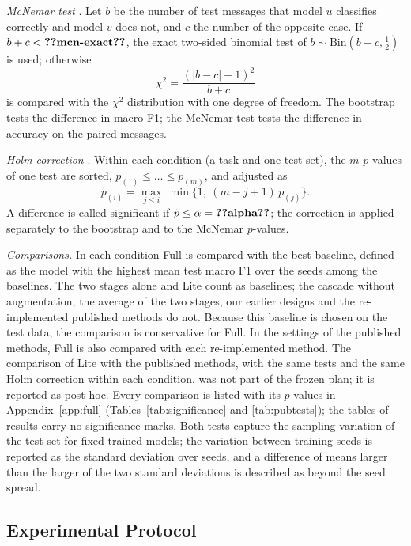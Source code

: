 \emph{McNemar test} \cite{mcnemar1947,dietterich1998}. Let $b$ be the number of test messages that model $u$ classifies correctly and model $v$ does not, and $c$ the number of the opposite case. If $b+c<\val{mcn-exact}$, the exact two-sided binomial test of $b\sim\mathrm{Bin}(b+c,\tfrac{1}{2})$ is used; otherwise
\begin{equation}\label{eq:mcnemar}
\chi^2=\frac{(|b-c|-1)^2}{b+c}
\end{equation}
is compared with the $\chi^2$ distribution with one degree of freedom. The bootstrap tests the difference in macro F1; the McNemar test tests the difference in accuracy on the paired messages.

\emph{Holm correction} \cite{holm1979,aickin1996}. Within each condition (a task and one test set), the $m$ $p$-values of one test are sorted, $p_{(1)}\le\dots\le p_{(m)}$, and adjusted as
\begin{equation}\label{eq:holm}
\tilde{p}_{(i)}=\max_{j\le i}\ \min\bigl\{1,\ (m-j+1)\,p_{(j)}\bigr\}.
\end{equation}
A difference is called significant if $\tilde{p}\le\alpha=\val{alpha}$; the correction is applied separately to the bootstrap and to the McNemar $p$-values.

\emph{Comparisons.} In each condition Full is compared with the best baseline, defined as the model with the highest mean test macro F1 over the  seeds among the baselines. The two stages alone and Lite count as baselines; the cascade without augmentation, the average of the two stages, our earlier designs and the re-implemented published methods do not. Because this baseline is chosen on the test data, the comparison is conservative for Full. In the settings of the published methods, Full is also compared with each re-implemented method. The comparison of Lite with the published methods, with the same tests and the same Holm correction within each condition, was not part of the frozen plan; it is reported as post hoc. Every comparison is listed with its $p$-values in Appendix~\ref{app:full} (Tables~\ref{tab:significance} and \ref{tab:pubtests}); the tables of results carry no significance marks. Both tests capture the sampling variation of the test set for fixed trained models; the variation between training seeds is reported as the standard deviation over seeds, and a difference of means larger than the larger of the two standard deviations is described as beyond the seed spread.

\subsection{Experimental Protocol}\label{sec:protocol}


